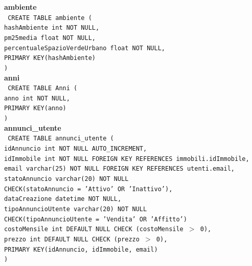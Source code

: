 \documentclass[a4paper,12pt]{report}
\begin{document}
                \noindent
                {\large \textbf{ambiente}} \\
                \texttt{
                    CREATE TABLE ambiente ( \\
                    \null\quad\quad hashAmbiente int NOT NULL, \\
                    \null\quad\quad pm25media                      float           NOT NULL, \\
                    \null\quad\quad percentualeSpazioVerdeUrbano    float           NOT NULL, \\
                    \null\quad\quad PRIMARY KEY(hashAmbiente) \\
                    )
                } \\

                \noindent
                {\large \textbf{anni}} \\
                \texttt{
                    CREATE TABLE Anni ( \\
                    \null\quad\quad anno    int     NOT NULL, \\
                    \null\quad\quad PRIMARY KEY(anno) \\
                    )
                } \\

                \newpage
                \noindent
                {\large \textbf{annunci\_utente}} \\
                \texttt{
                    CREATE TABLE annunci\_utente ( \\
                    \null\quad\quad idAnnuncio          int             NOT NULL AUTO\_INCREMENT, \\ 
                    \null\quad\quad idImmobile int NOT NULL FOREIGN KEY REFERENCES immobili.idImmobile, \\
                    \null\quad\quad email varchar(25) NOT NULL FOREIGN KEY REFERENCES utenti.email, \\
                    \null\quad\quad statoAnnuncio       varchar(20)         NOT NULL \\
                            \null\qquad\qquad CHECK(statoAnnuncio = 'Attivo' OR 'Inattivo'), \\
                    \null\quad\quad dataCreazione       datetime        NOT NULL, \\
                    \null\quad\quad tipoAnnuncioUtente  varchar(20)  NOT NULL \\
                            \null\qquad\qquad CHECK(tipoAnnuncioUtente = 'Vendita' OR 'Affitto') \\
                    \null\quad\quad costoMensile        int             DEFAULT NULL CHECK (costoMensile $>$ 0), \\
                    \null\quad\quad prezzo              int             DEFAULT NULL CHECK (prezzo $>$ 0),\\
                    \null\quad\quad PRIMARY KEY(idAnnuncio, idImmobile, email) \\
                    )
                    } \\
\end{document}
